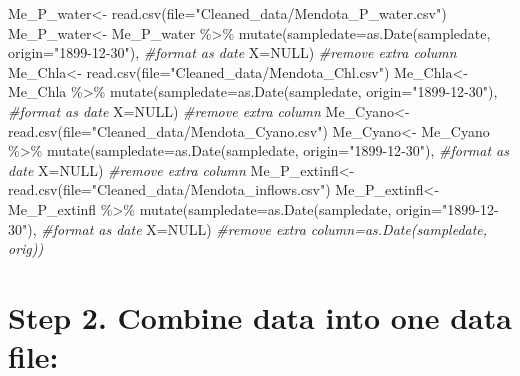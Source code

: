 \documentclass[
]{article}
\newenvironment{Shaded}{\begin{snugshade}}{\end{snugshade}}
\newcommand{\AttributeTok}[1]{\textcolor[rgb]{0.77,0.63,0.00}{#1}}
\newcommand{\CommentTok}[1]{\textcolor[rgb]{0.56,0.35,0.01}{\textit{#1}}}
\newcommand{\ConstantTok}[1]{\textcolor[rgb]{0.00,0.00,0.00}{#1}}
\newcommand{\FunctionTok}[1]{\textcolor[rgb]{0.00,0.00,0.00}{#1}}
\newcommand{\NormalTok}[1]{#1}
\newcommand{\OtherTok}[1]{\textcolor[rgb]{0.56,0.35,0.01}{#1}}
\newcommand{\SpecialCharTok}[1]{\textcolor[rgb]{0.00,0.00,0.00}{#1}}
\newcommand{\StringTok}[1]{\textcolor[rgb]{0.31,0.60,0.02}{#1}}
\begin{document}
\begin{Shaded}
\begin{Highlighting}[]
\NormalTok{Me\_P\_water}\OtherTok{\textless{}{-}} \FunctionTok{read.csv}\NormalTok{(}\AttributeTok{file=}\StringTok{"Cleaned\_data/Mendota\_P\_water.csv"}\NormalTok{)}
\NormalTok{Me\_P\_water}\OtherTok{\textless{}{-}}\NormalTok{ Me\_P\_water }\SpecialCharTok{\%\textgreater{}\%}
  \FunctionTok{mutate}\NormalTok{(}\AttributeTok{sampledate=}\FunctionTok{as.Date}\NormalTok{(sampledate, }\AttributeTok{origin=}\StringTok{"1899{-}12{-}30"}\NormalTok{), }\CommentTok{\#format as date}
         \AttributeTok{X=}\ConstantTok{NULL}\NormalTok{) }\CommentTok{\#remove extra column}
\NormalTok{Me\_Chla}\OtherTok{\textless{}{-}} \FunctionTok{read.csv}\NormalTok{(}\AttributeTok{file=}\StringTok{"Cleaned\_data/Mendota\_Chl.csv"}\NormalTok{)}
\NormalTok{Me\_Chla}\OtherTok{\textless{}{-}}\NormalTok{ Me\_Chla }\SpecialCharTok{\%\textgreater{}\%}
  \FunctionTok{mutate}\NormalTok{(}\AttributeTok{sampledate=}\FunctionTok{as.Date}\NormalTok{(sampledate, }\AttributeTok{origin=}\StringTok{"1899{-}12{-}30"}\NormalTok{), }\CommentTok{\#format as date}
         \AttributeTok{X=}\ConstantTok{NULL}\NormalTok{) }\CommentTok{\#remove extra column}
\NormalTok{Me\_Cyano}\OtherTok{\textless{}{-}} \FunctionTok{read.csv}\NormalTok{(}\AttributeTok{file=}\StringTok{"Cleaned\_data/Mendota\_Cyano.csv"}\NormalTok{)}
\NormalTok{Me\_Cyano}\OtherTok{\textless{}{-}}\NormalTok{ Me\_Cyano }\SpecialCharTok{\%\textgreater{}\%}
  \FunctionTok{mutate}\NormalTok{(}\AttributeTok{sampledate=}\FunctionTok{as.Date}\NormalTok{(sampledate, }\AttributeTok{origin=}\StringTok{"1899{-}12{-}30"}\NormalTok{), }\CommentTok{\#format as date}
         \AttributeTok{X=}\ConstantTok{NULL}\NormalTok{) }\CommentTok{\#remove extra column}
\NormalTok{Me\_P\_extinfl}\OtherTok{\textless{}{-}} \FunctionTok{read.csv}\NormalTok{(}\AttributeTok{file=}\StringTok{"Cleaned\_data/Mendota\_inflows.csv"}\NormalTok{)}
\NormalTok{Me\_P\_extinfl}\OtherTok{\textless{}{-}}\NormalTok{ Me\_P\_extinfl }\SpecialCharTok{\%\textgreater{}\%}
  \FunctionTok{mutate}\NormalTok{(}\AttributeTok{sampledate=}\FunctionTok{as.Date}\NormalTok{(sampledate, }\AttributeTok{origin=}\StringTok{"1899{-}12{-}30"}\NormalTok{), }\CommentTok{\#format as date}
         \AttributeTok{X=}\ConstantTok{NULL}\NormalTok{) }\CommentTok{\#remove extra column=as.Date(sampledate, orig))}
\end{Highlighting}
\end{Shaded}

\hypertarget{step-2.-combine-data-into-one-data-file}{%
\section{Step 2. Combine data into one data
file:}\label{step-2.-combine-data-into-one-data-file}}
\end{document}
